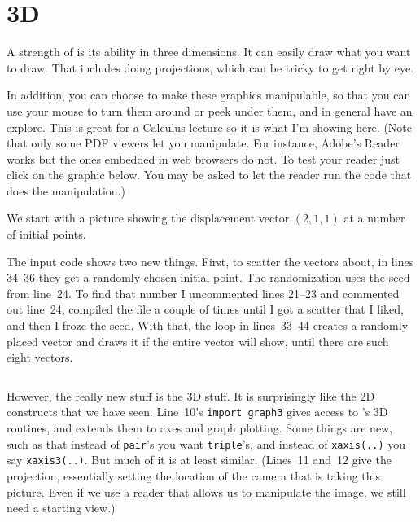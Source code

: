 \def\asydir{chapter4/asy}
\chapter{3D}

A strength of \Asy{} is its ability in three dimensions.
It can easily draw what you want to draw.
That includes 
doing projections, which can be tricky to get right by eye.

In addition, you can choose to make these graphics manipulable, so that you can 
use your mouse to turn them around or peek under them, and in 
general have an explore.
This is great for a Calculus lecture so it is what I'm showing here.
(Note that only some PDF viewers let you manipulate.
For instance, Adobe's Reader works but the ones embedded in web
browsers do not.
To test your reader just click on the graphic below.
You may be asked to let the reader 
run the code that does the manipulation.)

We start with a picture showing the displacement vector $(2,1,1)$ at a 
number of initial points.
\begin{center}
  
\end{center}  

The input code shows two new things.
First, to scatter the vectors about,
in lines 34--36 they get a randomly-chosen initial point.
The randomization uses the seed from line~24.
To find that number I uncommented lines 21--23 and commented out line~24,
compiled the  file a couple of times 
until I got a scatter that I liked, and then I froze the seed.
With that, the loop in
lines~33--44 creates a randomly placed vector and
draws it if the entire vector will show, 
until there are such eight vectors. 
\begin{center}
  \inputminted{Asymptote}{chapter4/asy/vectors.asy}
\end{center}
However, the really new stuff is the 3D stuff.
It is surprisingly like the 2D constructs that we have seen.
Line~10's 
\texttt{import graph3} gives access to 
\Asy's 3D routines, and extends them to axes and graph plotting.
Some things are new, such as that instead of 
\texttt{pair}'s
you want
\texttt{triple}'s, 
and instead of 
\texttt{xaxis(..)}
you say 
\texttt{xaxis3(..)}.
But much of it is at least similar.
(Lines~11 and~12 give the projection,
essentially setting the location of the camera
that is taking this picture.
Even if we use a reader that allows us to manipulate the image,
we still need a starting view.)

